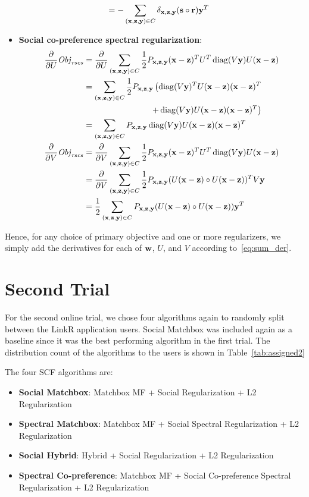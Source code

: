 \begin{itemize}
\begin{align*}
 & = - \sum_{(\mathbf{x},\mathbf{z},\mathbf{y}) \in C} \delta_{\mathbf{x},\mathbf{z},\mathbf{y}} (\mathbf{s} \circ \mathbf{r}) \mathbf{y}^T
\end{align*}
\item {\bf Social co-preference spectral regularization}:
\begin{align*}
\frac{\partial}{\partial U} \mathit{Obj}_{\mathit{rscs}} & = \frac{\partial}{\partial U} \sum_{(\mathbf{x},\mathbf{z},\mathbf{y}) \in C} \frac{1}{2} P_{\mathbf{x},\mathbf{z},\mathbf{y}} (\mathbf{x} - \mathbf{z})^T U^T \operatorname{diag}(V\mathbf{y}) U (\mathbf{x} - \mathbf{z})\\
& = \sum_{(\mathbf{x},\mathbf{z},\mathbf{y}) \in C} \frac{1}{2} P_{\mathbf{x},\mathbf{z},\mathbf{y}} \left( \operatorname{diag}(V\mathbf{y})^T U (\mathbf{x} - \mathbf{z}) (\mathbf{x} - \mathbf{z})^T \right.\\
& \left. \qquad \qquad \qquad \qquad + \operatorname{diag}(V\mathbf{y}) U (\mathbf{x} - \mathbf{z}) (\mathbf{x} - \mathbf{z})^T \right)\\
& = \sum_{(\mathbf{x},\mathbf{z},\mathbf{y}) \in C} P_{\mathbf{x},\mathbf{z},\mathbf{y}} \operatorname{diag}(V\mathbf{y}) U (\mathbf{x} - \mathbf{z}) (\mathbf{x} - \mathbf{z})^T\\
\frac{\partial}{\partial V} \mathit{Obj}_{\mathit{rscs}} & = \frac{\partial}{\partial V} \sum_{(\mathbf{x},\mathbf{z},\mathbf{y}) \in C} \frac{1}{2} P_{\mathbf{x},\mathbf{z},\mathbf{y}} (\mathbf{x} - \mathbf{z})^T U^T \operatorname{diag}(V\mathbf{y}) U (\mathbf{x} - \mathbf{z})\\
& = \frac{\partial}{\partial V} \sum_{(\mathbf{x},\mathbf{z},\mathbf{y}) \in C} \frac{1}{2} P_{\mathbf{x},\mathbf{z},\mathbf{y}} (U(\mathbf{x}-\mathbf{z}) \circ U(\mathbf{x}-\mathbf{z}))^T V\mathbf{y}\\
& = \frac{1}{2} \sum_{(\mathbf{x},\mathbf{z},\mathbf{y}) \in C} P_{\mathbf{x},\mathbf{z},\mathbf{y}} (U(\mathbf{x}-\mathbf{z}) \circ U(\mathbf{x}-\mathbf{z})) \mathbf{y}^T
\end{align*}
\end{itemize}

Hence, for any choice of primary objective and one or more regularizers,
we simply add the derivatives for each of $\mathbf{w}$, $U$, and $V$
according to~\eqref{eq:sum_der}.

\section{Second Trial}

For the second online trial, we chose four algorithms again to randomly split between the LinkR application users. Social Matchbox was included again as a baseline since it was the best performing algorithm in the first trial. The distribution count of the algorithms to the users is shown in Table~\ref{tab:assigned2}

The four SCF algorithms are:

\begin{itemize}
\item{{\bf Social Matchbox}: Matchbox MF + Social Regularization +  L2 Regularization}
\item{{\bf Spectral Matchbox}: Matchbox MF + Social Spectral Regularization + L2 Regularization}
\item{{\bf Social Hybrid}: Hybrid + Social Regularization + L2 Regularization}
\item{{\bf Spectral Co-preference}: Matchbox MF + Social Co-preference Spectral Regularization + L2 Regularization}
\end{itemize}

